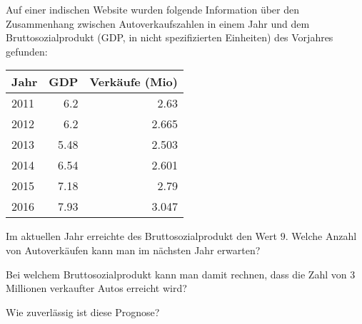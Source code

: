 Auf einer indischen Website wurden folgende Information über den
Zusammenhang zwischen Autoverkaufszahlen in einem Jahr und
dem Bruttosozialprodukt (GDP, in nicht spezifizierten Einheiten)
des Vorjahres gefunden:
\begin{center}
\begin{tabular}{|l|r|r|}
\hline
Jahr&GDP&Verkäufe (Mio)\\
\hline
2011&6.2\phantom{0}&2.63\phantom{0}\\
2012&6.2\phantom{0}&2.665\\
2013&5.48&2.503\\
2014&6.54&2.601\\
2015&7.18&2.79\phantom{0}\\
2016&7.93&3.047\\
\hline
\end{tabular}
\end{center}
\begin{teilaufgaben}
\item 
Im aktuellen Jahr erreichte des Bruttosozialprodukt den Wert $9$.
Welche Anzahl von Autoverkäufen kann man im nächsten Jahr erwarten?
\item
Bei welchem Bruttosozialprodukt kann man damit rechnen, dass die
Zahl von 3 Millionen verkaufter Autos erreicht wird?
\item
Wie zuverlässig ist diese Prognose?
\end{teilaufgaben}

